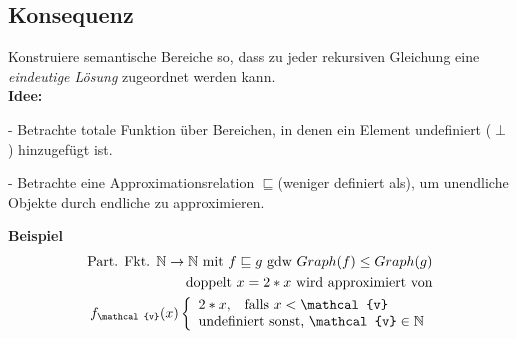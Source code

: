 \subsection{Konsequenz}
Konstruiere semantische Bereiche so, dass zu jeder rekursiven Gleichung eine \emph{eindeutige Lösung} zugeordnet werden kann.\\
\textbf{Idee:} 
\begin{compactitem}
	\item[-] Betrachte totale Funktion über Bereichen, in denen ein Element undefiniert ($\perp$) hinzugefügt ist.
	\item[-] Betrachte eine Approximationsrelation $\sqsubseteq$(weniger definiert als), um unendliche Objekte durch endliche zu approximieren.
	\item[\textbf{Beispiel}]
	\begin{align*}
		\text{Part. Fkt. } \mathbb{N}\rightarrow \mathbb{N}\text{ mit } f \sqsubseteq g \text{ gdw } Graph(f) \leq Graph(g)\\
		\text{doppelt } x = 2 * x \text{ wird approximiert von}\\
		f_{\mathcal{v}}(x)
		\left\lbrace\begin{array}{l l}
		2*x\text{,} \quad\text{falls } x<\mathcal{v}\\
		\text{undefiniert sonst, } \mathcal{v} \in \mathbb{N}\\ 
		\end{array}\right.\\
	\end{align*}
\end{compactitem}
